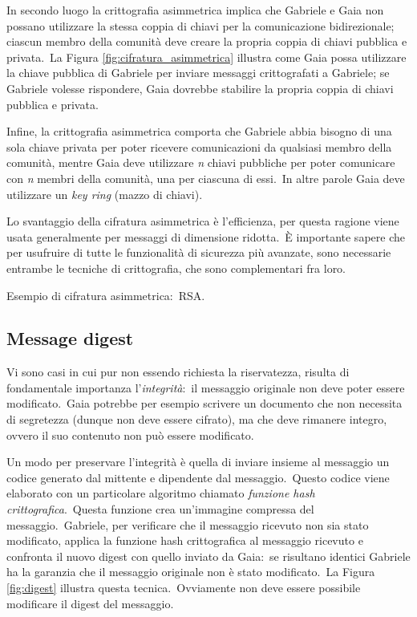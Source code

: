 In secondo luogo la crittografia asimmetrica implica che Gabriele e Gaia non possano utilizzare la stessa coppia di chiavi per la comunicazione bidirezionale; ciascun membro della comunità deve creare la propria coppia di chiavi pubblica e privata.\
La Figura \ref{fig:cifratura_asimmetrica} illustra come Gaia possa utilizzare la chiave pubblica di Gabriele per inviare messaggi crittografati a Gabriele; se Gabriele volesse rispondere, Gaia dovrebbe stabilire la propria coppia di chiavi pubblica e privata.

Infine, la crittografia asimmetrica comporta che Gabriele abbia bisogno di una sola chiave privata per poter ricevere comunicazioni da qualsiasi membro della comunità, mentre Gaia deve utilizzare \textit{n} chiavi pubbliche per poter comunicare con \textit{n} membri della comunità, una per ciascuna di essi.\
In altre parole Gaia deve utilizzare un \textit{key ring} (mazzo di chiavi).

Lo svantaggio della cifratura asimmetrica è l’efficienza, per questa ragione viene usata generalmente per messaggi di dimensione ridotta.\
È importante sapere che per usufruire di tutte le funzionalità di sicurezza più avanzate, sono necessarie entrambe le tecniche di crittografia, che sono complementari fra loro.

Esempio di cifratura asimmetrica:\ RSA.

\subsection{Message digest}

Vi sono casi in cui pur non essendo richiesta la riservatezza, risulta di fondamentale importanza l'\textit{integrità}:\ il messaggio originale non deve poter essere modificato.\
Gaia potrebbe per esempio scrivere un documento che non necessita di segretezza (dunque non deve essere cifrato), ma che deve rimanere integro, ovvero il suo contenuto non può essere modificato.

Un modo per preservare l'integrità è quella di inviare insieme al messaggio un codice generato dal mittente e dipendente dal messaggio.\
Questo codice viene elaborato con un particolare algoritmo chiamato \textit{funzione hash crittografica}.\
Questa funzione crea un'immagine compressa del messaggio.\
Gabriele, per verificare che il messaggio ricevuto non sia stato modificato, applica la funzione hash crittografica al messaggio ricevuto e confronta il nuovo digest con quello inviato da Gaia:\ se risultano identici Gabriele ha la garanzia che il messaggio originale non è stato modificato.\
La Figura \ref{fig:digest} illustra questa tecnica.\
Ovviamente non deve essere possibile modificare il digest del messaggio.

